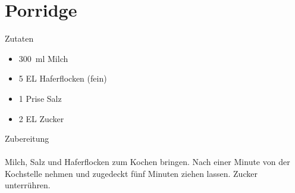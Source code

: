\section*{Porridge}
\ihead{}\ohead{}
\cfoot{}
{\Large Zutaten}
\begin{itemize}
    \item \SI{300}{ml} Milch
    \item \num{5} EL Haferflocken (fein)
    \item \num{1} Prise Salz
    \item \num{2} EL Zucker
\end{itemize}
\noindent
{\Large Zubereitung}\\
\\
Milch, Salz und Haferflocken zum Kochen bringen.
Nach einer Minute von der Kochstelle nehmen und zugedeckt fünf Minuten ziehen lassen. 
Zucker unterrühren.